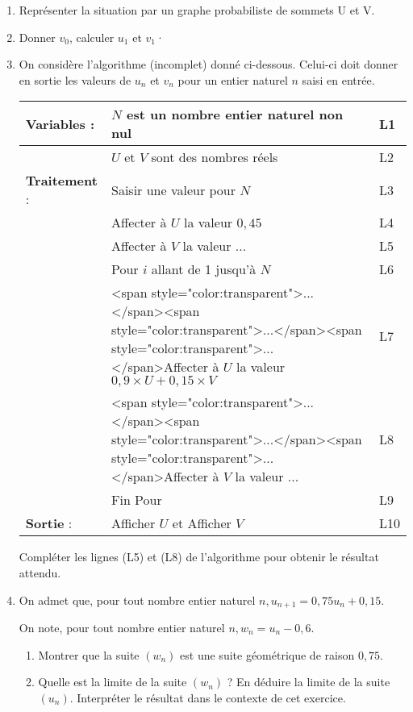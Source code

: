\begin{enumerate}
     \item
     Représenter la situation par un graphe probabiliste de sommets U et V.
     \item
     Donner $v_{0}$, calculer $u_{1}$ et $v_{1}$·
     \item
     On considère l'algorithme (incomplet) donné ci-dessous. Celui-ci doit donner en sortie les valeurs de $u_{n}$ et $v_{n}$ pour un entier naturel $n$ saisi en entrée.
     \begin{tabularx}{0.8\linewidth}{|*{3}{>{\centering \arraybackslash }X|}}%
          \hline
          \textbf{Variables} : & $N$ est un nombre entier naturel non nul	 & L1
          \\ \hline
          & $U$ et $V$ sont des nombres réels								 & L2
          \\ \hline
          \textbf{Traitement} : & Saisir une valeur pour $N$				 & L3
          \\ \hline
          & Affecter à $U$ la valeur $0,45$									 & L4
          \\ \hline
          & Affecter à $V$ la valeur ...						 & L5
          \\ \hline
          & Pour $i$ allant de 1 jusqu'à $N$								 & L6
          \\ \hline
          & <span style="color:transparent">...</span><span style="color:transparent">...</span><span style="color:transparent">...</span>Affecter à $U$ la valeur $0,9 \times  U+0,15 \times  V$			 & L7
          \\ \hline
          & <span style="color:transparent">...</span><span style="color:transparent">...</span><span style="color:transparent">...</span>Affecter à $V$ la valeur ...				 & L8
          \\ \hline
          & Fin Pour														 & L9
          \\ \hline
          \textbf{Sortie} : & Afficher $U$ et Afficher $V$					 & L10
          \\ \hline
     \end{tabularx}
\par
Compléter les lignes (L5) et (L8) de l'algorithme pour obtenir le résultat attendu.
\item
On admet que, pour tout nombre entier naturel $n, u_{n+1}=0, 75u_{n}+0,15$.
\par
On note, pour tout nombre entier naturel $n, w_{n}=u_{n}-0,6$.
\begin{enumerate}[label=\alph*.]
     \item
     Montrer que la suite $\left(w_{n}\right)$ est une suite géométrique de raison $0,75$.
     \item
Quelle est la limite de la suite $\left(w_{n}\right)$ ? En déduire la limite de la suite $\left(u_{n}\right)$. Interpréter le résultat dans le contexte de cet exercice.\end{enumerate}
\end{enumerate}
